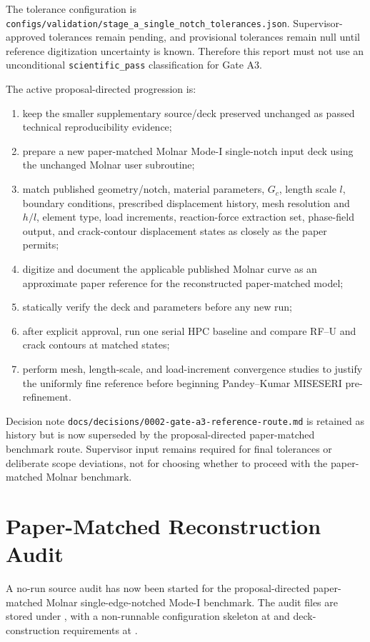 \documentclass[11pt,a4paper]{article}
\begin{document}
The tolerance configuration is \texttt{configs/validation/stage\_a\_single\_notch\_tolerances.json}. Supervisor-approved tolerances remain pending, and provisional tolerances remain null until reference digitization uncertainty is known. Therefore this report must not use an unconditional \texttt{scientific\_pass} classification for Gate A3.

The active proposal-directed progression is:
\begin{enumerate}
  \item keep the smaller supplementary source/deck preserved unchanged as passed technical reproducibility evidence;
  \item prepare a new paper-matched Molnar Mode-I single-notch input deck using the unchanged Molnar user subroutine;
  \item match published geometry/notch, material parameters, \(G_c\), length scale \(l\), boundary conditions, prescribed displacement history, mesh resolution and \(h/l\), element type, load increments, reaction-force extraction set, phase-field output, and crack-contour displacement states as closely as the paper permits;
  \item digitize and document the applicable published Molnar curve as an approximate paper reference for the reconstructed paper-matched model;
  \item statically verify the deck and parameters before any new run;
  \item after explicit approval, run one serial HPC baseline and compare RF--U and crack contours at matched states;
  \item perform mesh, length-scale, and load-increment convergence studies to justify the uniformly fine reference before beginning Pandey--Kumar MISESERI pre-refinement.
\end{enumerate}

Decision note \texttt{docs/decisions/0002-gate-a3-reference-route.md} is retained as history but is now superseded by the proposal-directed paper-matched benchmark route. Supervisor input remains required for final tolerances or deliberate scope deviations, not for choosing whether to proceed with the paper-matched Molnar benchmark.

\section{Paper-Matched Reconstruction Audit}

A no-run source audit has now been started for the proposal-directed paper-matched Molnar single-edge-notched Mode-I benchmark. The audit files are stored under
, with a non-runnable configuration skeleton at
 and deck-construction requirements at
.
\end{document}
